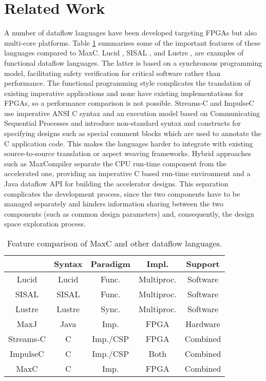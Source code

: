 \section{Related Work}

A number of dataflow languages have been developed targeting FPGAs but
also multi-core platforms. Table \ref{table:feature-comparison}
summarises some of the important features of these languages compared
to MaxC. Lucid \cite{ashcroft1977lucid}, SISAL
\cite{gurd1987implicit}, \cite{mcgraw1983sisal} and Lustre
\cite{halbwachs1991synchronous}, are examples of functional dataflow
languages. The latter is based on a synchronous programming model,
facilitating safety verification for critical software
\cite{halbwachs1992programming} rather than performance. The
functional programming style complicates the translation of existing
imperative applications and none have existing implementations for
FPGAs, so a performance comparison is not possible.
Streams-C\cite{Gokhale:Stone:Arnold:Kalinowski:2000} and
ImpulseC\cite{ImpulseC} use imperative ANSI C syntax and an execution
model based on Communicating Sequential Processes and introduce
non-standard syntax and constructs for specifying designs such as
special comment blocks which are used to annotate the C application
code. This makes the languages harder to integrate with existing
source-to-source translation or aspect weaving frameworks. Hybrid
approaches such as MaxCompiler \cite{MaxelerTechnologies:2012}
separate the CPU run-time component from the accelerated one, providing
an imperative C based run-time environment and a Java dataflow API for
building the accelerator designs. This separation complicates the
development process, since the two components have to be managed
separately and hinders information sharing between the two components
(such as common design parameters) and, consequently, the design space
exploration process.

\begin{table}[!h]
  \renewcommand{\arraystretch}{1.2}
  \centering
  \caption{Feature comparison of MaxC and other dataflow languages.}
  \label{table:feature-comparison}
  \begin{tabular}{ c |  c |  c |  c |  c }
    \hline
    \         & \bf{Syntax} & \bf{Paradigm} & \bf{Impl.} & \bf{Support} \\
    \hline \hline
    Lucid     & Lucid       & Func.         & Multiproc. & Software     \\
    SISAL     & SISAL       & Func.         & Multiproc. & Software     \\
    Lustre    & Lustre      & Sync.         & Multiproc. & Software     \\
    MaxJ      & Java        & Imp.          & FPGA       & Hardware     \\
    Streams-C & C           & Imp./CSP      & FPGA       & Combined     \\
    ImpulseC  & C           & Imp./CSP      & Both       & Combined     \\
    MaxC      & C           & Imp.          & FPGA       & Combined     \\
  \end{tabular}
\end{table}

